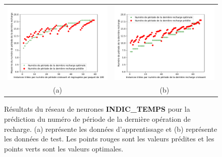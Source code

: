 
\begin{figure}[H]
	\centering
	\begin{tabular}{c c}
		\includegraphics[width=9cm]{images_these/6000_prediction_reseauALternativeLearning_train_data.pdf}&
		\includegraphics[width=9cm]{images_these/6000_prediction_reseauALternativeLearning_test_data.pdf}
		\\
		(a) & (b)
	\end{tabular}
	\caption[Résultats du réseau de neurones INDIC\_TEMPS]{Résultats du réseau de neurones \textbf{INDIC\_TEMPS} pour la prédiction du numéro de période de la dernière opération de recharge. (a) représente les données d'apprentissage et (b) représente les données de test. Les points rouges sont les valeurs prédites et les points verts sont les valeurs optimales.}\label{6000_prediction_reseauALternativeLearning}
\end{figure}




